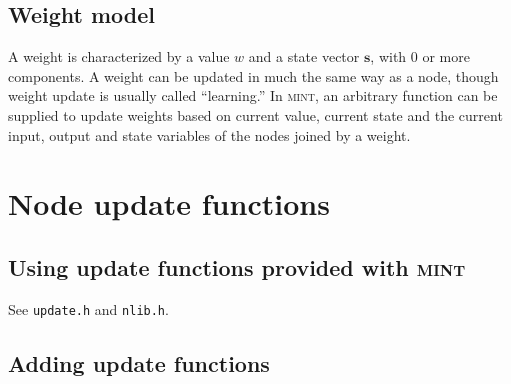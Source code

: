 \documentclass[11pt,letterpaper]{memoir}
\newcommand{\mint}{{\scshape\sffamily mint}\xspace}
\renewcommand{\vec}[1]{\ensuremath{\mathbf#1}\xspace}
\begin{document}
\subsection{Weight model}
\label{sec:weightmodel}
A weight is characterized by a value $w$ and a state vector $\vec s$,
with 0 or more components. A weight can be updated in much the same
way as a node, though weight update is usually called ``learning.''
In \mint, an arbitrary function can be supplied to update weights
based on current value, current state and the current input, output
and state variables of the nodes joined by a weight.

\section{Node update functions}
\label{sec:nupdate}

\subsection{Using update functions provided with \mint}
\label{sec:update-using}

See \lstinline{update.h} and \lstinline{nlib.h}.

\subsection{Adding update functions}
\label{sec:update-adding}
\end{document}
